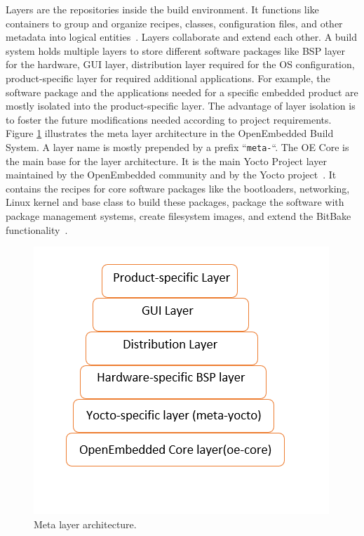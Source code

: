 Layers are the repositories inside the build environment. It functions like containers to group and organize recipes, classes, configuration files, and other metadata into logical entities~\parencite{Reference1}. Layers collaborate and extend each other. A build system holds multiple layers to store different software packages like \ac{BSP} layer for the hardware, \ac{GUI} layer, distribution layer required for the OS configuration, product-specific layer for required additional applications.  For example, the software package and the applications needed for a specific embedded product are mostly isolated into the product-specific layer. The advantage of layer isolation is to foster the future modifications needed according to project requirements. Figure \ref{fig:Meta layer architecture} illustrates the meta layer architecture in the OpenEmbedded Build System. A layer name is mostly prepended by a prefix “\texttt{meta-}“. The OE Core is the main base for the layer architecture. It is the main Yocto Project layer maintained by the OpenEmbedded community and by the Yocto project~\parencite[p.~150]{violanteembedded}. It contains the recipes for core software packages like the bootloaders, networking, Linux kernel and base class to build these packages, package the software with package management systems, create filesystem images, and extend the BitBake functionality~\parencite{Reference1}.
\begin{figure}[H]
\centering
\includegraphics[scale=0.8]{figures/Layers.png}
\caption[Meta layer architecture]{Meta layer architecture.}
\label{fig:Meta layer architecture}
\end{figure}

